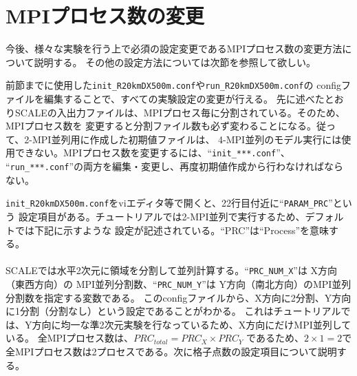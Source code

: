 

\section{MPIプロセス数の変更}
今後、様々な実験を行う上で必須の設定変更であるMPIプロセス数の変更方法について説明する。
その他の設定方法については次節を参照して欲しい。

前節までに使用した\verb|init_R20kmDX500m.conf|や\verb|run_R20kmDX500m.conf|の
configファイルを編集することで、すべての実験設定の変更が行える。
先に述べたとおりSCALEの入出力ファイルは、MPIプロセス毎に分割されている。そのため、MPIプロセス数を
変更すると分割ファイル数も必ず変わることになる。従って、2-MPI並列用に作成した初期値ファイルは、
4-MPI並列のモデル実行には使用できない。MPIプロセス数を変更するには、``\verb|init_***.conf|''、
``\verb|run_***.conf|''の両方を編集・変更し、再度初期値作成から行わなければならない。

\verb|init_R20kmDX500m.conf|をviエディタ等で開くと、22行目付近に``\verb|PARAM_PRC|''という
設定項目がある。チュートリアルでは2-MPI並列で実行するため、デフォルトでは下記に示すような
設定が記述されている。``PRC''は``Process''を意味する。\\

{\small {\gt
{}}}\\

SCALEでは水平2次元に領域を分割して並列計算する。``\verb|PRC_NUM_X|''は X方向（東西方向）の
MPI並列分割数、``\verb|PRC_NUM_Y|''は Y方向（南北方向）のMPI並列分割数を指定する変数である。
このconfigファイルから、X方向に2分割、Y方向に1分割（分割なし）という設定であることがわかる。
これはチュートリアルでは、Y方向に均一な準2次元実験を行なっているため、X方向にだけMPI並列している。
全MPIプロセス数は、${PRC}_{total}={PRC}_{X} \times {PRC}_{Y}$ であるため、$2 \times 1 = 2$で
全MPIプロセス数は2プロセスである。次に格子点数の設定項目について説明する。\\

